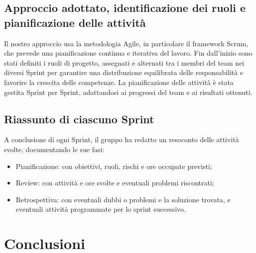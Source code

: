 \documentclass[11pt,a4paper]{article}
\begin{document}
\subsection{Approccio adottato, identificazione dei ruoli e pianificazione delle attività}
Il nostro approccio usa la metodologia Agile, in particolare il framework Scrum, che prevede una pianificazione continua e iterativa del lavoro. 
Fin dall’inizio sono stati definiti i ruoli di progetto, assegnati e alternati tra i membri del team nei diversi Sprint per garantire una distribuzione equilibrata delle responsabilità e favorire la crescita delle competenze.
La pianificazione delle attività è stata gestita Sprint per Sprint, adattandosi ai progressi del team e ai risultati ottenuti. 

\subsection{Riassunto di ciascuno Sprint}
A conclusione di ogni Sprint, il gruppo ha redatto un resoconto delle attività svolte, documentando le sue fasi:
\begin{itemize}
\item Pianificazione: con obiettivi, ruoli, rischi e ore occupate previsti;
\item Review: con attività e ore svolte e eventuali problemi riscontrati;
\item Retrospettiva: con eventuali dubbi o problemi e la soluzione trovata, e eventuali attività programmate per lo sprint successivo. 
\end{itemize}

\newpage

\section{Conclusioni}
\end{document}
